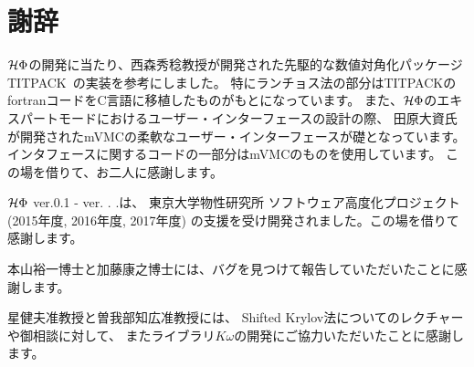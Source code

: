 \chapter{謝辞}
\label{Ch:ack}
$\mathcal{H} \Phi$の開発に当たり、西森秀稔教授が開発された先駆的な数値対角化パッケージTITPACK~\cite{titpack}の実装を参考にしました。
特にランチョス法の部分はTITPACKのfortranコードをC言語に移植したものがもとになっています。
また、$\mathcal{H} \Phi$のエキスパートモードにおけるユーザー・インターフェースの設計の際、
田原大資氏が開発されたmVMCの柔軟なユーザー・インターフェースが礎となっています。
インタフェースに関するコードの一部分はmVMCのものを使用しています。
この場を借りて、お二人に感謝します。

$\mathcal{H} \Phi$ ver.0.1 - ver. \hspace{-0.2cm}
    \hspace{-0.2cm}.
    \hspace{-0.2cm}.は、
東京大学物性研究所 ソフトウェア高度化プロジェクト(2015年度, 2016年度, 2017年度)
の支援を受け開発されました。この場を借りて感謝します。

本山裕一博士と加藤康之博士には、バグを見つけて報告していただいたことに感謝します。

星健夫准教授と曽我部知広准教授には、
Shifted Krylov法についてのレクチャーや御相談に対して、
またライブラリ$K\omega$の開発にご協力いただいたことに感謝します。
